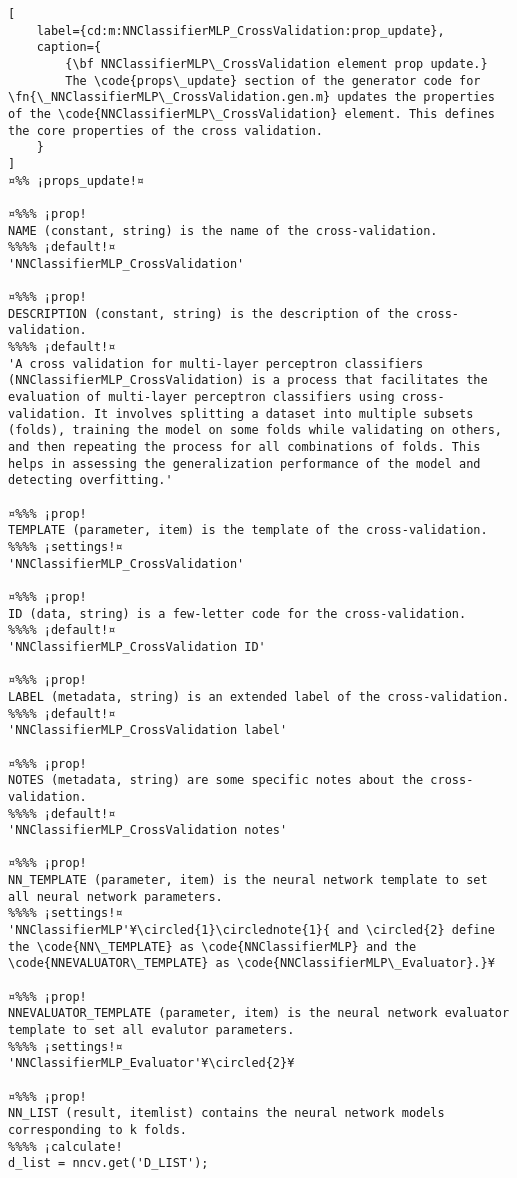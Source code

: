 \documentclass{tufte-handout}
\begin{document}
\begin{lstlisting}[
	label={cd:m:NNClassifierMLP_CrossValidation:prop_update},
	caption={
		{\bf NNClassifierMLP\_CrossValidation element prop update.}
		The \code{props\_update} section of the generator code for \fn{\_NNClassifierMLP\_CrossValidation.gen.m} updates the properties of the \code{NNClassifierMLP\_CrossValidation} element. This defines the core properties of the cross validation.
	}
]
¤%% ¡props_update!¤

¤%%% ¡prop!
NAME (constant, string) is the name of the cross-validation.
%%%% ¡default!¤
'NNClassifierMLP_CrossValidation'

¤%%% ¡prop!
DESCRIPTION (constant, string) is the description of the cross-validation.
%%%% ¡default!¤
'A cross validation for multi-layer perceptron classifiers (NNClassifierMLP_CrossValidation) is a process that facilitates the evaluation of multi-layer perceptron classifiers using cross-validation. It involves splitting a dataset into multiple subsets (folds), training the model on some folds while validating on others, and then repeating the process for all combinations of folds. This helps in assessing the generalization performance of the model and detecting overfitting.'

¤%%% ¡prop!
TEMPLATE (parameter, item) is the template of the cross-validation.
%%%% ¡settings!¤
'NNClassifierMLP_CrossValidation'

¤%%% ¡prop!
ID (data, string) is a few-letter code for the cross-validation.
%%%% ¡default!¤
'NNClassifierMLP_CrossValidation ID'

¤%%% ¡prop!
LABEL (metadata, string) is an extended label of the cross-validation.
%%%% ¡default!¤
'NNClassifierMLP_CrossValidation label'

¤%%% ¡prop!
NOTES (metadata, string) are some specific notes about the cross-validation.
%%%% ¡default!¤
'NNClassifierMLP_CrossValidation notes'

¤%%% ¡prop!
NN_TEMPLATE (parameter, item) is the neural network template to set all neural network parameters.
%%%% ¡settings!¤
'NNClassifierMLP'¥\circled{1}\circlednote{1}{ and \circled{2} define the \code{NN\_TEMPLATE} as \code{NNClassifierMLP} and the \code{NNEVALUATOR\_TEMPLATE} as \code{NNClassifierMLP\_Evaluator}.}¥

¤%%% ¡prop!
NNEVALUATOR_TEMPLATE (parameter, item) is the neural network evaluator template to set all evalutor parameters.
%%%% ¡settings!¤
'NNClassifierMLP_Evaluator'¥\circled{2}¥

¤%%% ¡prop!
NN_LIST (result, itemlist) contains the neural network models corresponding to k folds.
%%%% ¡calculate!
d_list = nncv.get('D_LIST');


\end{lstlisting}
\end{document}
